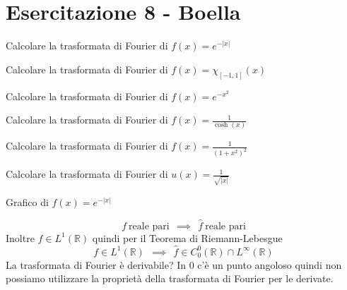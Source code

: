 \chapter{Esercitazione 8 - Boella}
\ParteEsercizi
\Esercizio{}

Calcolare la trasformata di Fourier di $f(x)=e^{-|x|}$
\Esercizio{}

Calcolare la trasformata di Fourier di $f(x)=\chi _{[-1,1]} (x)$
\Esercizio{}

Calcolare la trasformata di Fourier di $f(x)=e^{-x^{2}}$
\Esercizio{}

Calcolare la trasformata di Fourier di $f(x)=\frac{1}{\cosh (x)}$
\Esercizio{}

Calcolare la trasformata di Fourier di $f(x)=\frac{1}{\left( 1+x^{2}\right)^{2}}$
\Esercizio{}

Calcolare la trasformata di Fourier di $u(x)=\frac{1}{\sqrt{|x|}}$

\ParteSoluzioni
\Soluzione

Grafico di $f( x) =e^{-| x| }$

\begin{equation*}
f\ \text{reale pari} \ \ \implies \ \ \hat{f} \ \text{reale pari}
\end{equation*}
Inoltre $f\in L^{1}(\mathbb{R})$ quindi per il Teorema di Riemann-Lebesgue
\begin{equation*}
f\in L^{1}(\mathbb{R}) \ \ \implies \ \ \hat{f} \in C^{0}_{0}(\mathbb{R}) \cap L^{\infty }(\mathbb{R})
\end{equation*}
La trasformata di Fourier è derivabile? In $0$ c'è un punto angoloso quindi non possiamo utilizzare la proprietà della trasformata di Fourier per le derivate.

